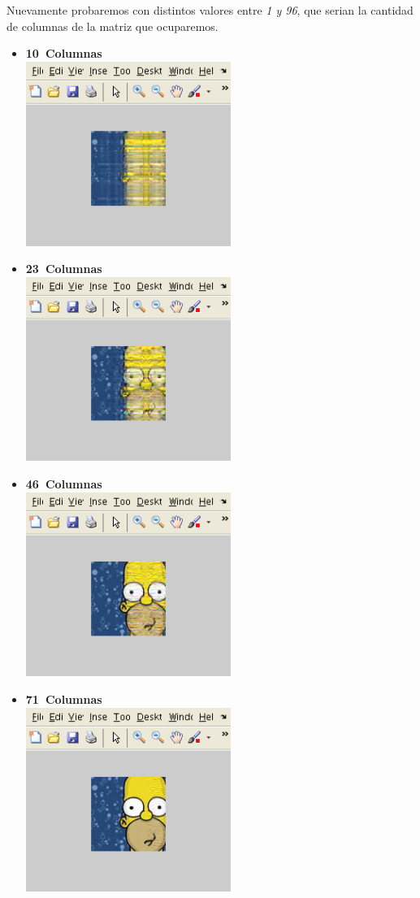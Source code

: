 Nuevamente probaremos con distintos valores entre \emph{1 y 96}, que serian la cantidad de columnas de la matriz que ocuparemos.

	\begin{itemize}
		\item \textbf{10\ Columnas}\\
			\includegraphics[height=6cm]{img/homeroQR_10} 	
		\item \textbf{23\ Columnas}\\
			\includegraphics[height=6cm]{img/homeroQR_23} 	
		\item \textbf{46\ Columnas}\\
			\includegraphics[height=6cm]{img/homeroQR_46} 	
		\item \textbf{71\ Columnas}\\
			\includegraphics[height=6cm]{img/homeroQR_71} 	

\end{itemize}
